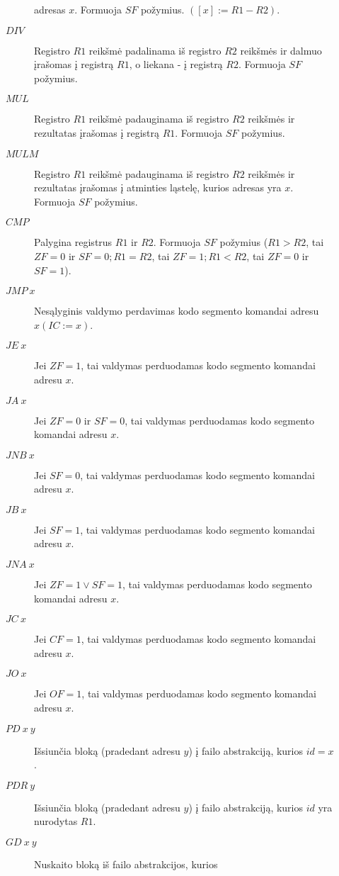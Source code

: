 \begin{description}
\begin{description}
          adresas $x$. Formuoja $SF$ požymius. $([x]:=R1-R2)$.
        \item[$DIV$] Registro $R1$ reikšmė padalinama iš registro $R2$ 
          reikšmės ir dalmuo įrašomas į registrą $R1$, o liekana - į 
          registrą $R2$. Formuoja $SF$ požymius.
        \item[$MUL$] Registro $R1$ reikšmė padauginama iš registro $R2$ 
          reikšmės ir rezultatas įrašomas į registrą $R1$. 
          Formuoja $SF$ požymius.
        \item[$MULM$] Registro $R1$ reikšmė padauginama iš registro $R2$ 
          reikšmės ir rezultatas įrašomas į atminties ląstelę, kurios
          adresas yra $x$. Formuoja $SF$ požymius.
        \item[$CMP$] Palygina registrus $R1$ ir $R2$. Formuoja $SF$ požymius
          ($R1>R2$, tai $ZF=0$ ir $SF=0; R1=R2$, tai $ZF=1; R1<R2$, 
          tai $ZF=0$ ir $SF=1$).
        \item[$JMP \: x$] Nesąlyginis valdymo perdavimas kodo segmento 
          komandai adresu  $x (IC:=x)$.
        \item[$JE \: x$] Jei $ZF=1$, tai valdymas perduodamas kodo segmento 
          komandai adresu $x$.
        \item[$JA \: x$] Jei $ZF=0$ ir $SF=0$, tai valdymas perduodamas kodo
          segmento komandai adresu $x$.
        \item[$JNB \: x$] Jei $SF=0$, tai valdymas perduodamas 
          kodo segmento komandai adresu $x$.
        \item[$JB \: x$] Jei $SF=1$, tai valdymas perduodamas kodo segmento
          komandai adresu $x$.
        \item[$JNA \: x$] Jei $ZF = 1 \lor SF=1$, tai valdymas perduodamas 
          kodo segmento komandai adresu $x$.
        \item[$JC \: x$] Jei $CF = 1$, tai valdymas perduodamas kodo 
          segmento komandai adresu $x$.
        \item[$JO \: x$] Jei $OF = 1$, tai valdymas perduodamas kodo 
          segmento komandai adresu $x$.
        \item[$PD \: x \: y$] Išsiunčia bloką (pradedant adresu 
          $y$) į failo abstrakciją, kurios $id = x$.
        \item[$PDR \: y$] Išsiunčia bloką (pradedant adresu 
          $y$) į failo abstrakciją, kurios $id$ yra nurodytas $R1$.
        \item[$GD \: x \: y$] Nuskaito bloką iš failo abstrakcijos, kurios

\end{description}
\end{description}
